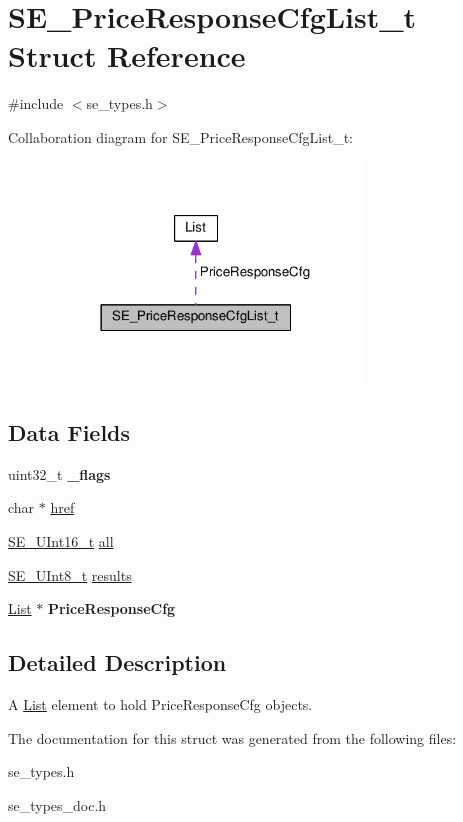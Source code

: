 \hypertarget{structSE__PriceResponseCfgList__t}{}\section{S\+E\+\_\+\+Price\+Response\+Cfg\+List\+\_\+t Struct Reference}
\label{structSE__PriceResponseCfgList__t}


{\ttfamily \#include $<$se\+\_\+types.\+h$>$}



Collaboration diagram for S\+E\+\_\+\+Price\+Response\+Cfg\+List\+\_\+t\+:\nopagebreak
\begin{figure}[H]
\begin{center}
\leavevmode
\includegraphics[width=237pt]{structSE__PriceResponseCfgList__t__coll__graph}
\end{center}
\end{figure}
\subsection*{Data Fields}
\begin{DoxyCompactItemize}
\item 
uint32\+\_\+t {\bfseries \+\_\+flags}
\item 
char $\ast$ \hyperlink{group__PriceResponseCfgList_gaafcdf8624acc281dbf337e52d3ba7920}{href}
\item 
\hyperlink{group__UInt16_gac68d541f189538bfd30cfaa712d20d29}{S\+E\+\_\+\+U\+Int16\+\_\+t} \hyperlink{group__PriceResponseCfgList_gafc25afa368784ecc6e17e2ff3859e3df}{all}
\item 
\hyperlink{group__UInt8_gaf7c365a1acfe204e3a67c16ed44572f5}{S\+E\+\_\+\+U\+Int8\+\_\+t} \hyperlink{group__PriceResponseCfgList_gafd624b9ac0b68ef68e109fea294cfda0}{results}
\item 
\hyperlink{structList}{List} $\ast$ {\bfseries Price\+Response\+Cfg}
\end{DoxyCompactItemize}


\subsection{Detailed Description}
A \hyperlink{structList}{List} element to hold Price\+Response\+Cfg objects. 

The documentation for this struct was generated from the following files\+:\begin{DoxyCompactItemize}
\item 
se\+\_\+types.\+h\item 
se\+\_\+types\+\_\+doc.\+h\end{DoxyCompactItemize}
